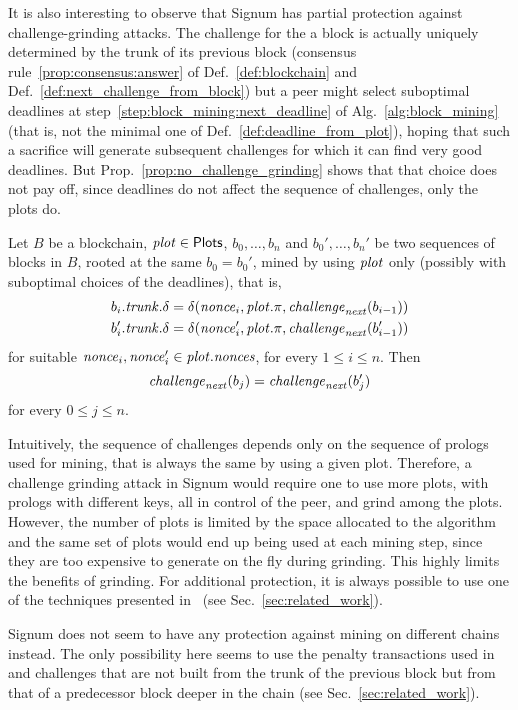 It is also interesting to observe that Signum has partial protection
against challenge-grinding attacks.
The challenge for the a block is actually uniquely determined by the trunk of its
previous block
(consensus rule~\ref{prop:consensus:answer} of Def.~\ref{def:blockchain}
and Def.~\ref{def:next_challenge_from_block}) but a peer
might select suboptimal deadlines at step~\ref{step:block_mining:next_deadline}
of Alg.~\ref{alg:block_mining} (that is, not the minimal one of Def.~\ref{def:deadline_from_plot}),
hoping that such a sacrifice will generate subsequent challenges for which it
can find very good deadlines.
But Prop.~\ref{prop:no_challenge_grinding} shows that that
choice does not pay off, since deadlines do not
affect the sequence of challenges, only the plots do.
%
\begin{proposition}\label{prop:no_challenge_grinding}
  Let $B$ be a blockchain, ${\mathit{plot}}\in{\mathsf{Plots}}$, $b_0,\ldots,b_n$ and
  $b_0',\ldots,b_n'$ be two sequences of blocks in $B$, rooted at the same
  $b_0=b_0'$, mined by using ${\mathit{plot}}$ only
  (possibly with suboptimal choices of the deadlines), that is,
  \begin{align*}
    b_i.{\mathit{trunk}}.\delta&=\delta({\mathit{nonce}}_i,{\mathit{plot}}.\pi,{\mathit{challenge}}_{\mathit{next}}(b_{i-1}))\\
    b'_i.{\mathit{trunk}}.\delta&=\delta({\mathit{nonce}}'_i,{\mathit{plot}}.\pi,{\mathit{challenge}}_{\mathit{next}}(b'_{i-1}))
  \end{align*}
  for suitable ${\mathit{nonce}}_i,{\mathit{nonce}}_i'\in{\mathit{plot}}.{\mathit{nonces}}$, for every $1\le i\le n$. Then
  \[
  {\mathit{challenge}}_{\mathit{next}}(b_j)={\mathit{challenge}}_{\mathit{next}}(b'_j)
  \]
  for every $0\le j\le n$.
\end{proposition}
%
Intuitively, the sequence of challenges depends only on
the sequence of prologs used for mining, that is always the same by using a given plot.
Therefore, a challenge grinding attack in Signum
would require one to use more plots, with prologs with different keys, all in control of the peer,
and grind among the plots. However, the number of plots is limited by the space
allocated to the algorithm and the same set of plots
would end up being used at each mining step, since they are too expensive to generate
on the fly during grinding. This highly
limits the benefits of grinding. For additional protection, it is always possible to use
one of the techniques presented in~\cite{ParkKFGAP18} (see Sec.~\ref{sec:related_work}).

Signum does not seem to have any protection against mining on different chains instead.
The only possibility here seems to use the penalty transactions used in~\cite{ParkKFGAP18}
and challenges that
are not built from the trunk of the previous block but from that of a predecessor block deeper in the chain
(see Sec.~\ref{sec:related_work}).

